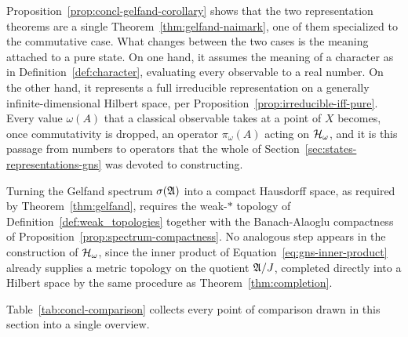 	\begin{remark}
		\label{rem:concl-points-vs-hilbert}
		Proposition~\ref{prop:concl-gelfand-corollary} shows that the two representation theorems are a single Theorem~\ref{thm:gelfand-naimark}, one of them specialized to the commutative case. What changes between the two cases is the meaning attached to a pure state. On one hand, it assumes the meaning of a character as in Definition~\ref{def:character}, evaluating every observable to a real number. On the other hand, it represents a full irreducible representation on a generally infinite-dimensional Hilbert space, per Proposition~\ref{prop:irreducible-iff-pure}. Every value $\omega(A)$ that a classical observable takes at a point of $X$ becomes, once commutativity is dropped, an operator $\pi_\omega(A)$ acting on $\H_\omega$, and it is this passage from numbers to operators that the whole of Section~\ref{sec:states-representations-gns} was devoted to constructing.
	\end{remark}
	
	\begin{remark}
		\label{rem:concl-topology-comparison}
		Turning the Gelfand spectrum $\sigma(\mathfrak{A})$ into a compact Hausdorff space, as required by Theorem~\ref{thm:gelfand}, requires the weak-$*$ topology of Definition~\ref{def:weak_topologies} together with the Banach-Alaoglu compactness of Proposition~\ref{prop:spectrum-compactness}. No analogous step appears in the construction of $\H_\omega$, since the inner product of Equation~\eqref{eq:gns-inner-product} already supplies a metric topology on the quotient $\mathfrak{A}/J$, completed directly into a Hilbert space by the same procedure as Theorem~\ref{thm:completion}. 
	\end{remark}
	
	\noindent Table~\ref{tab:concl-comparison} collects every point of comparison drawn in this section into a single overview.
	

